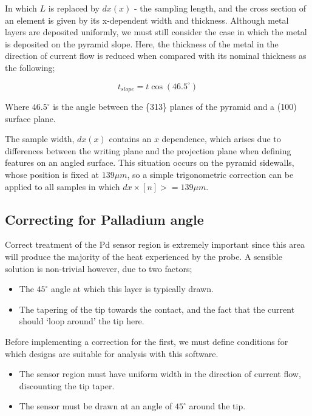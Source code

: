 \documentclass[]{report}
\begin{document}
In which $L$ is replaced by $dx(x)$ - the sampling length, and the cross section of an element is given by its x-dependent width and thickness. Although metal layers are deposited uniformly, we must still consider the case in which the metal is deposited on the pyramid slope. Here, the thickness of the metal in the direction of current flow is reduced when compared with its nominal thickness as the following;

\begin{equation}
t_{slope}=t \cos(46.5^{\circ})
\end{equation}

Where $46.5^{\circ}$ is the angle between the \{313\} planes of the pyramid and a (100) surface plane.

The sample width,  $dx(x)$ contains an $x$ dependence, which arises due to differences between the writing plane and the projection plane when defining features on an angled surface. This situation occurs on the pyramid sidewalls, whose position is fixed at $139\mu m$, so a simple trigonometric correction can be applied to all samples in which $dx \times [n] >= 139\mu m$.

\subsection{Correcting for Palladium angle}

Correct treatment of the Pd sensor region is extremely important since this area will produce the majority of the heat experienced by the probe. A sensible solution is non-trivial however, due to two factors;

\begin{itemize}
  \item The $45^{\circ}$ angle at which this layer is typically drawn.
  \item The tapering of the tip towards the contact, and the fact that the current should `loop around' the tip here.
\end{itemize}


Before implementing a correction for the first, we must define conditions for which designs are suitable for analysis with this software.

\begin{itemize}
  \item The sensor region must have uniform width in the direction of current flow, discounting the tip taper.
  \item The sensor must be drawn at an angle of $45^{\circ}$ around the tip.
\end{itemize}
\end{document}
